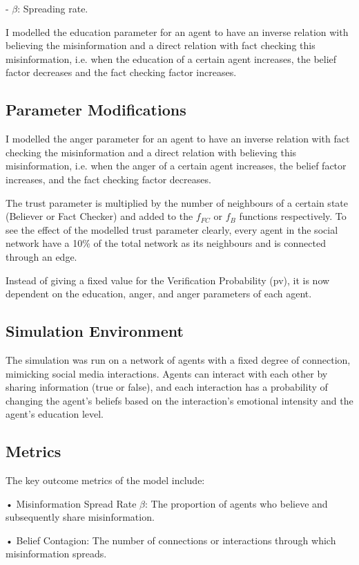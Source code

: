 \documentclass[twocolumn, a4paper, 12pt]{article}
\begin{document}
   - $\beta$: Spreading rate.

I modelled the education parameter for an agent to have an inverse relation with believing the misinformation and a direct relation with fact checking this misinformation, i.e. when the education of a certain agent increases, the belief factor decreases and the fact checking factor increases. \cite{education}

\subsection{Parameter Modifications}
I modelled the anger parameter for an agent to have an inverse relation with fact checking the misinformation and a direct relation with believing this misinformation, i.e. when the anger of a certain agent increases, the belief factor increases, and the fact checking factor decreases. \cite{emotion}

The trust parameter is multiplied by the number of neighbours of a certain state (Believer or Fact Checker) and added to the $f_{FC}$ or $f_B$ functions respectively. To see the effect of the modelled trust parameter clearly, every agent in the social network have a 10\% of the total network as its neighbours and is connected through an edge.

Instead of giving a fixed value for the Verification Probability (pv), it is now dependent on the education, anger, and anger parameters of each agent.

\subsection{Simulation Environment}
The simulation was run on a network of agents with a fixed degree of connection, mimicking social media interactions. Agents can interact with each other by sharing information (true or false), and each interaction has a probability of changing the agent’s beliefs based on the interaction’s emotional intensity and the agent’s education level.

\subsection{Metrics}
The key outcome metrics of the model include:

• Misinformation Spread Rate $\beta$: The proportion of agents who believe and
subsequently share misinformation.

• Belief Contagion: The number of connections or interactions through which
misinformation spreads.
\end{document}
